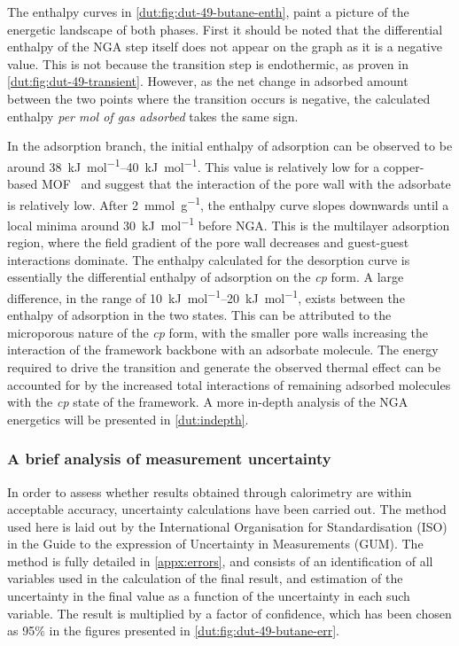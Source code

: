 The enthalpy curves in \autoref{dut:fig:dut-49-butane-enth},
paint a picture of the energetic landscape of both phases.
First it should be noted that the differential enthalpy of
the NGA step itself does not appear on the graph as it is a
negative value. This is not because the transition step is 
endothermic, as proven in \autoref{dut:fig:dut-49-transient}. 
However, as the net change in adsorbed amount between the two
points where the transition occurs is negative, the calculated
enthalpy \textit{per mol of gas adsorbed} takes the same sign.

In the adsorption branch, the initial enthalpy of adsorption 
can be observed to be around \SIrange{38}{40}{\kilo\joule\per\mol}.
This value is relatively low for a copper-based 
MOF~\cite{langeStructuralFlexibilityCopperbased2014} and suggest
that the interaction of the pore wall with the adsorbate is 
relatively low. After \SI{2}{\milli\mol\per\gram}, the enthalpy
curve slopes downwards until a local minima around 
\SI{30}{\kilo\joule\per\mol} before NGA. 
This is the multilayer adsorption region,
where the field gradient of the pore wall decreases and guest-guest 
interactions dominate.
The enthalpy calculated for the desorption curve is essentially the 
differential enthalpy of adsorption on the \textit{cp} form. A large 
difference, in the range of \SIrange{10}{20}{\kilo\joule\per\mol}, exists
between the enthalpy of adsorption in the two states. This can be 
attributed to the microporous nature of the \textit{cp} form, with the
smaller pore walls increasing the interaction of the framework backbone
with an adsorbate molecule. The energy required to drive the 
transition and generate the observed thermal effect can be accounted 
for by the increased total interactions of remaining adsorbed 
molecules with the \textit{cp} state of the framework.
A more in-depth analysis of the NGA energetics will be presented 
in \autoref{dut:indepth}.

\subsubsection{A brief analysis of measurement uncertainty}

In order to assess whether results obtained through calorimetry
are within acceptable accuracy, uncertainty calculations have been
carried out. The method used here is laid out by the International 
Organisation for Standardisation (ISO) in the Guide to the expression
of Uncertainty in Measurements (GUM). The method is fully detailed 
in \autoref{appx:errors}, and consists of an identification of 
all variables used in the calculation of the final result, and 
estimation of the uncertainty in the final value as a function of
the uncertainty in each such variable. The result is multiplied
by a factor of confidence, which has been chosen as 95\% in the 
figures presented in \autoref{dut:fig:dut-49-butane-err}.


